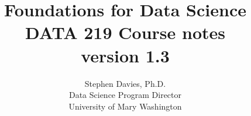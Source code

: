 \documentclass[11pt]{book}
\begin{document}
\title{{\huge Foundations for Data Science}\\
DATA 219 Course notes
\\{\small version 1.3}}
\author{Stephen Davies, Ph.D.\\Data Science Program Director\\University of Mary Washington}
\date{}
\maketitle

\frontmatter

\renewcommand{\contentsname}{Contents}

\setcounter{tocdepth}{0}
\tableofcontents

%

\setcounter{chapter}{0}

\mainmatter





























\backmatter
\printindex
\end{document}
